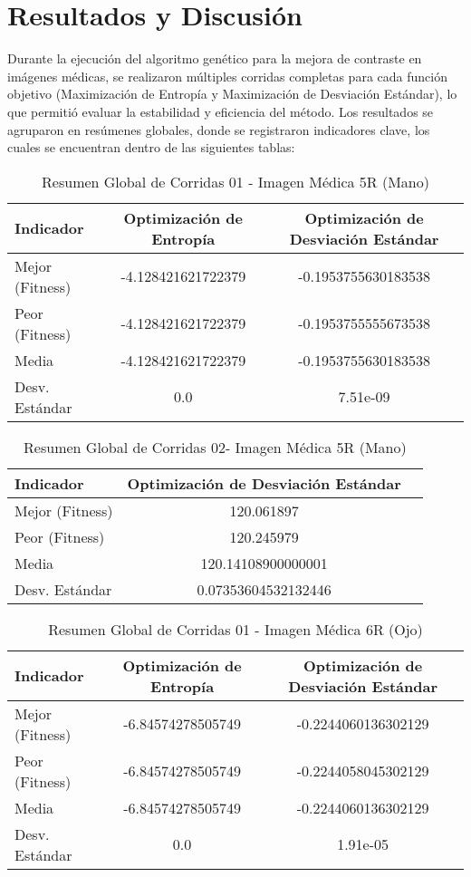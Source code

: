 \chapter{Resultados y Discusión}

Durante la ejecución del algoritmo genético para la mejora de contraste en imágenes médicas, se realizaron múltiples corridas completas para cada función objetivo (Maximización de Entropía y Maximización de Desviación Estándar), lo que permitió evaluar la estabilidad y eficiencia del método. Los resultados se agruparon en resúmenes globales, donde se registraron indicadores clave, los cuales se encuentran dentro de las siguientes tablas:

\begin{table}[H]
\centering
\caption{Resumen Global de Corridas 01 - Imagen Médica 5R (Mano)}
\begin{tabular}{lcc}
\hline
\textbf{Indicador} & \textbf{Optimización de Entropía} & \textbf{Optimización de Desviación Estándar} \\
\hline
Mejor (Fitness) & -4.128421621722379 & -0.1953755630183538 \\
Peor (Fitness) & -4.128421621722379 & -0.1953755555673538 \\
Media & -4.128421621722379 & -0.1953755630183538 \\
Desv. Estándar & 0.0 & 7.51e-09 \\
\hline
\end{tabular}
\end{table}

\begin{table}[H]
    \centering
    \caption{Resumen Global de Corridas 02- Imagen Médica 5R (Mano)}
    \begin{tabular}{lcc}
    \hline
    \textbf{Indicador} & \textbf{Optimización de Desviación Estándar} \\
    \hline
    Mejor (Fitness) & 120.061897 \\
    Peor (Fitness) & 120.245979 \\
    Media & 120.14108900000001 \\
    Desv. Estándar & 0.07353604532132446 \\
    \hline
    \end{tabular}
\end{table}


\begin{table}[H]
    \centering
    \caption{Resumen Global de Corridas 01 - Imagen Médica 6R (Ojo)}
    \begin{tabular}{lcc}
    \hline
    \textbf{Indicador} & \textbf{Optimización de Entropía} & \textbf{Optimización de Desviación Estándar} \\
    \hline
    Mejor (Fitness) & -6.84574278505749 & -0.2244060136302129 \\
    Peor (Fitness) & -6.84574278505749 & -0.2244058045302129 \\
    Media & -6.84574278505749 & -0.2244060136302129 \\
    Desv. Estándar & 0.0 & 1.91e-05 \\
    \hline
    \end{tabular}
\end{table}

